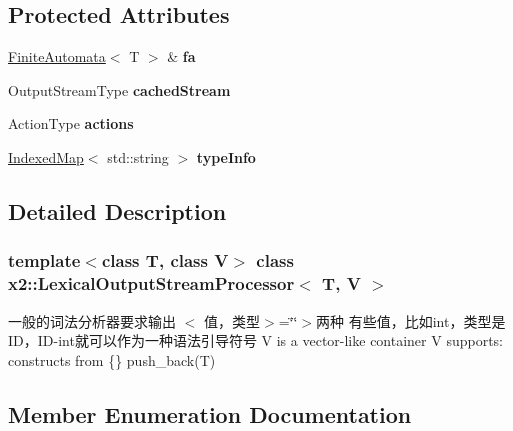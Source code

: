 \subsection*{Protected Attributes}
\begin{DoxyCompactItemize}
\item 
\mbox{\label{classx2_1_1_lexical_output_stream_processor_a26c478133a4944e7eb19872d6ca78eba}} 
\hyperlink{classx2_1_1_finite_automata}{Finite\+Automata}$<$ T $>$ \& {\bfseries fa}
\item 
\mbox{\label{classx2_1_1_lexical_output_stream_processor_a255e05cf7a51dc60d2b7afe02ff4eec6}} 
Output\+Stream\+Type {\bfseries cached\+Stream}
\item 
\mbox{\label{classx2_1_1_lexical_output_stream_processor_a54670c34772bcf9763f45065d7564d52}} 
Action\+Type {\bfseries actions}
\item 
\mbox{\label{classx2_1_1_lexical_output_stream_processor_a79c52ead270f8e1b6c2ed44a362c4267}} 
\hyperlink{classx2_1_1_indexed_map}{Indexed\+Map}$<$ std\+::string $>$ {\bfseries type\+Info}
\end{DoxyCompactItemize}


\subsection{Detailed Description}
\subsubsection*{template$<$class T, class V$>$\newline
class x2\+::\+Lexical\+Output\+Stream\+Processor$<$ T, V $>$}

一般的词法分析器要求输出 $<$ 值，类型$>$=\char`\"{}\char`\"{}$>$两种 有些值，比如int，类型是\+I\+D，\+I\+D-\/int就可以作为一种语法引导符号 V is a vector-\/like container V supports\+: constructs from \{\} push\+\_\+back(\+T) 

\subsection{Member Enumeration Documentation}
\mbox{\label{classx2_1_1_lexical_output_stream_processor_a221c7064aea399ed949761e3e784acd7}} 
